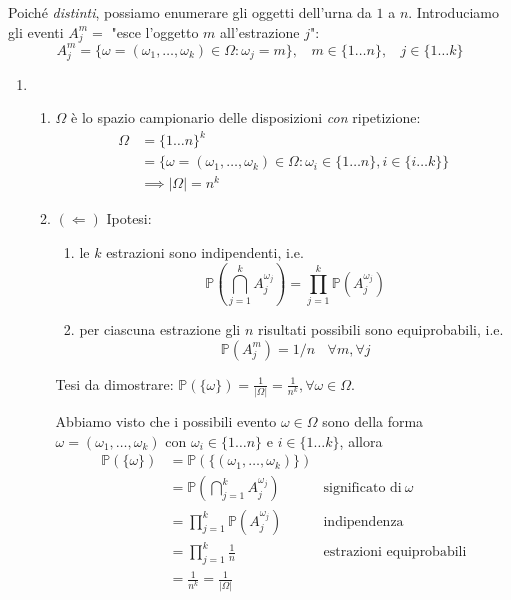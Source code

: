 Poiché \textit{distinti}, possiamo enumerare gli oggetti dell'urna da $1$ a $n$. Introduciamo gli eventi $A_{j}^{m} =$ "esce l'oggetto $m$ all'estrazione $j$":
\begin{equation*}
A_{j}^{m} =\{\omega =( \omega _{1} ,\dotsc ,\omega _{k}) \in \Omega :\omega _{j} =m\} ,\ \ \ \ m\in \{1\dotsc n\} ,\ \ \ \ j\in \{1\dotsc k\}
\end{equation*}
\begin{enumerate}
\item 
\begin{enumerate}
\item $\Omega $ è lo spazio campionario delle disposizioni \textit{con} ripetizione:\begin{equation*}
\begin{aligned}
\Omega  & =\{1\dotsc n\}^{k}\\
 & =\{\omega =( \omega _{1} ,\dotsc ,\omega _{k}) \in \Omega :\omega _{i} \in \{1\dotsc n\} ,i\in \{i\dotsc k\}\}\\
 & \implies | \Omega | =n^{k}
\end{aligned}
\end{equation*}
\item $( \Leftarrow )$ Ipotesi:
\begin{enumerate}
\item le $k$ estrazioni sono indipendenti, i.e.\begin{equation*}
\mathbb{P}\left(\bigcap _{j=1}^{k} A_{j}^{\omega _{j}}\right) =\prod _{j=1}^{k}\mathbb{P}\left( A_{j}^{\omega _{j}}\right)
\end{equation*}
\item per ciascuna estrazione gli $n$ risultati possibili sono equiprobabili, i.e.\begin{equation*}
\mathbb{P}\left( A_{j}^{m}\right) =1/n\ \ \ \ \forall m,\forall j
\end{equation*}
\end{enumerate}

Tesi da dimostrare: $\mathbb{P}(\{\omega \}) =\frac{1}{| \Omega | } =\frac{1}{n^{k}} ,\forall \omega \in \Omega $.

Abbiamo visto che i possibili evento $\omega \in \Omega $ sono della forma $\omega =( \omega _{1} ,\dotsc ,\omega _{k})$ con $\omega _{i} \in \{1\dotsc n\}$ e $i\in \{1\dotsc k\}$, allora\begin{equation*}
\begin{aligned}
\mathbb{P}(\{\omega \}) & =\mathbb{P}(\{( \omega _{1} ,\dotsc ,\omega _{k})\}) & \\
 & =\mathbb{P}\left(\bigcap _{j=1}^{k} A_{j}^{\omega _{j}}\right) & \text{significato di} \ \omega \\
 & =\prod _{j=1}^{k}\mathbb{P}\left( A_{j}^{\omega _{j}}\right) & \text{indipendenza}\\
 & =\prod _{j=1}^{k}\frac{1}{n} & \text{estrazioni equiprobabili}\\
 & =\frac{1}{n^{k}} =\frac{1}{| \Omega | } & 
\end{aligned}
\end{equation*}


\end{enumerate}
\end{enumerate}
